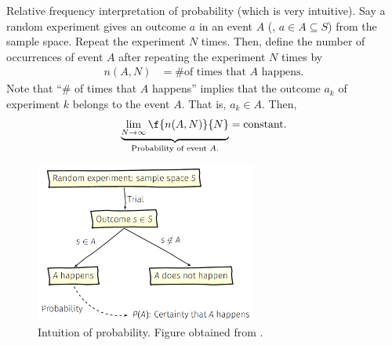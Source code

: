 \begin{example}
    Relative frequency interpretation of probability (which is very intuitive).
    Say a random experiment gives an outcome $a$ in an event $A$ (\ie, $a\in A\subseteq S$) from the sample space. Repeat the experiment $N$ times. Then, define the number of occurrences of event $A$ after repeating the experiment $N$ times by
    \begin{align}
        n(A,N) &= \text{\# of times that $A$ happens}.
    \end{align}
    Note that ``\# of times that $A$ happens'' implies that the outcome $a_{k}$ of experiment $k$ belongs to the event $A$. That is, $a_{k}\in A$.
    Then, 
    \begin{align}
        \underbrace{\lim_{N\rightarrow\infty} \f{n(A,N)}{N}}_{\text{Probability of event $A$.}} = \text{constant}.
    \end{align}
    \triqed
\end{example}

\begin{figure}[h]
    \centering
    \includegraphics[width=0.65\textwidth]{figs/1_review_prob_intuition.PNG}
    \caption{Intuition of probability. Figure obtained from \cite{psaromiligkos_slides_2019}.}
    \label{fig:prob. intuition}
\end{figure}

